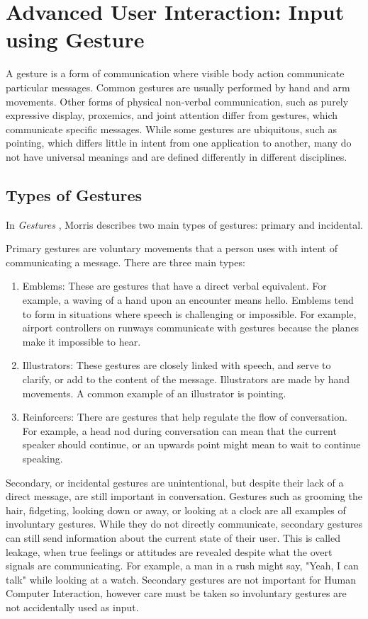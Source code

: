 \section{Advanced User Interaction: Input using Gesture}

A gesture is a form of communication where visible body action communicate particular messages.
Common gestures are usually performed by hand and arm movements.
Other forms of physical non-verbal communication, such as purely expressive display, proxemics, and joint attention differ from gestures, which communicate specific messages.
While some gestures are ubiquitous, such as pointing, which differs little in intent from one application to another, many do not have universal meanings and are defined differently in different disciplines.

\subsection{Types of Gestures}

In \textit{Gestures} \cite{morris79}, Morris describes two main types of gestures: primary and incidental.

Primary gestures are voluntary movements that a person uses with intent of communicating a message. There are three main types:
\begin{enumerate}
\item Emblems: These are gestures that have a direct verbal equivalent. 
For example, a waving of a hand upon an encounter means hello. 
Emblems tend to form in situations where speech is challenging or impossible.
For example, airport controllers on runways communicate with gestures because the planes make it impossible to hear.
\item Illustrators: These gestures are closely linked with speech, and serve to clarify, or add to the content of the message. 
Illustrators are made by hand movements.
A common example of an illustrator is pointing.
\item Reinforcers: There are gestures that help regulate the flow of conversation.
For example, a head nod during conversation can mean that the current speaker should continue, or an upwards point might mean to wait to continue speaking.
\end{enumerate}

Secondary, or incidental gestures are unintentional, but despite their lack of a direct message, are still important in conversation.
Gestures such as grooming the hair, fidgeting, looking down or away, or looking at a clock are all examples of involuntary gestures.
While they do not directly communicate, secondary gestures can still send information about the current state of their user.
This is called leakage, when true feelings or attitudes are revealed despite what the overt signals are communicating.
For example, a man in a rush might say, "Yeah, I can talk" while looking at a watch.
Secondary gestures are not important for Human Computer Interaction, however care must be taken so involuntary gestures are not accidentally used as input. 

